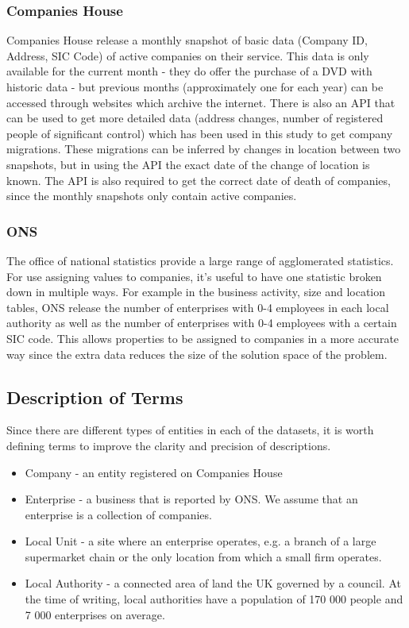 \documentclass[a4paper,10pt]{article}
\begin{document}
\subsubsection{Companies House}
Companies House release a monthly snapshot of basic data (Company ID, Address, SIC Code) of active companies on their service. This data is only available for the current month - they do offer the purchase of a DVD with historic data - but previous months (approximately one for each year) can be accessed through websites which archive the internet. There is also an API that can be used to get more detailed data (address changes, number of registered people of significant control) which has been used in this study to get company migrations. These migrations can be inferred by changes in location between two snapshots, but in using the API the exact date of the change of location is known. The API is also required to get the correct date of death of companies, since the monthly snapshots only contain active companies.

\subsubsection{ONS}
The office of national statistics provide a large range of agglomerated statistics. For use assigning values to companies, it's useful to have one statistic broken down in multiple ways. For example in the business activity, size and location tables, ONS release the number of enterprises with 0-4 employees in each local authority as well as the number of enterprises with 0-4 employees with a certain SIC code. This allows properties to be assigned to companies in a more accurate way since the extra data reduces the size of the solution space of the problem.

\subsection{Description of Terms}
Since there are different types of entities in each of the datasets, it is worth defining terms to improve the clarity and precision of descriptions.
\begin{itemize}
 \item Company - an entity registered on Companies House
 \item Enterprise - a business that is reported by ONS. We assume that an enterprise is a collection of companies.
 \item Local Unit - a site where an enterprise operates, e.g. a branch of a large supermarket chain or the only location from which a small firm operates.
 \item Local Authority - a connected area of land the UK governed by a council. At the time of writing, local authorities have a population of 170 000 people and 7 000 enterprises on average.
\end{itemize}
\end{document}

